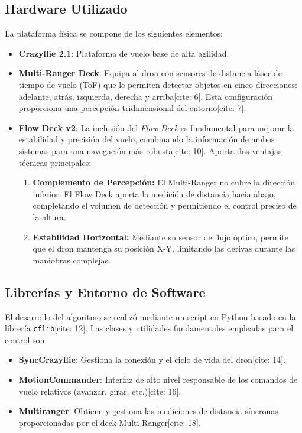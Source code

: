\documentclass[12pt,a4paper]{article}
\begin{document}
\subsection{Hardware Utilizado}
La plataforma física se compone de los siguientes elementos:
\begin{itemize}
    \item \textbf{Crazyflie 2.1}: Plataforma de vuelo base de alta agilidad.
    \item \textbf{Multi-Ranger Deck}: Equipa al dron con sensores de distancia láser de tiempo de vuelo (ToF) que le permiten detectar objetos en cinco direcciones: adelante, atrás, izquierda, derecha y arriba[cite: 6]. Esta configuración proporciona una percepción tridimensional del entorno[cite: 7].
    \item \textbf{Flow Deck v2}: La inclusión del \textit{Flow Deck} es fundamental para mejorar la estabilidad y precisión del vuelo, combinando la información de ambos sistemas para una navegación más robusta[cite: 10]. Aporta dos ventajas técnicas principales:
    \begin{enumerate}
        \item \textbf{Complemento de Percepción:} El Multi-Ranger no cubre la dirección inferior. El Flow Deck aporta la medición de distancia hacia abajo, completando el volumen de detección y permitiendo el control preciso de la altura.
        \item \textbf{Estabilidad Horizontal:} Mediante su sensor de flujo óptico, permite que el dron mantenga su posición X-Y, limitando las derivas durante las maniobras complejas.
    \end{enumerate}
\end{itemize}
\subsection{Librerías y Entorno de Software}
El desarrollo del algoritmo se realizó mediante un script en Python basado en la librería \texttt{cflib}[cite: 12]. Las clases y utilidades fundamentales empleadas para el control son:
\begin{itemize}
    \item \textbf{SyncCrazyflie}: Gestiona la conexión y el ciclo de vida del dron[cite: 14].
    \item \textbf{MotionCommander}: Interfaz de alto nivel responsable de los comandos de vuelo relativos (avanzar, girar, etc.)[cite: 16].
    \item \textbf{Multiranger}: Obtiene y gestiona las mediciones de distancia síncronas proporcionadas por el deck Multi-Ranger[cite: 18].
\end{itemize}
\end{document}
